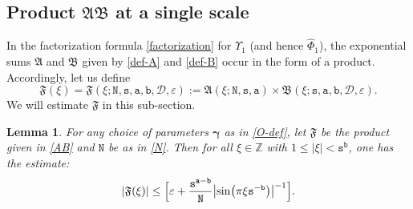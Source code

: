 \documentclass[12pt, twoside]{article}
\newtheorem{lemma}[theorem]{Lemma}
\theoremstyle{definition}
\numberwithin{equation}{section}
\begin{document}
\subsection{Product $\mathfrak A \mathfrak B$ at a single scale} \label{AB-single-section} 
In the factorization formula \eqref{factorization} for $\Upsilon_1$ (and hence $\widehat{\Phi}_1$), the exponential sums $\mathfrak A$ and $\mathfrak B$ given by \eqref{def-A} and \eqref{def-B} occur in the form of a product. Accordingly, let us define 
\begin{equation} \label{AB} 
\mathfrak F(\xi) = \mathfrak F(\xi; \mathtt N, \mathtt s, \mathtt a, \mathtt b, \mathscr{D}, \varepsilon) := \mathfrak A(\xi; \mathtt N, \mathtt s, \mathtt a) \times \mathfrak B(\xi; \mathtt s, \mathtt a, \mathtt b, \mathscr{D}, \varepsilon). 
\end{equation}  
We will estimate $\mathfrak F$ in this sub-section. 
\begin{lemma} \label{single-scale-product-lemma}
For any choice of parameters $\pmb{\gamma}$ as in \eqref{O-def}, let $\mathfrak F$ be the product given in \eqref{AB} and $\mathtt N$ be as in \eqref{N}. Then for all $\xi \in \mathbb Z$ with $1 \leq |\xi| < \mathtt s^{\mathtt b}$, one has the estimate:
\begin{equation} \label{F-est}
|\mathfrak F(\xi)| \leq \Bigl[ \varepsilon + \frac{\mathtt s^{\mathtt a - \mathtt b}}{\mathtt N} \bigl| \sin \bigl(\pi \xi \mathtt s^{-\mathtt b} \bigr)\bigr|^{-1}\Bigr].  
\end{equation} 
\end{lemma} 
\end{document}
